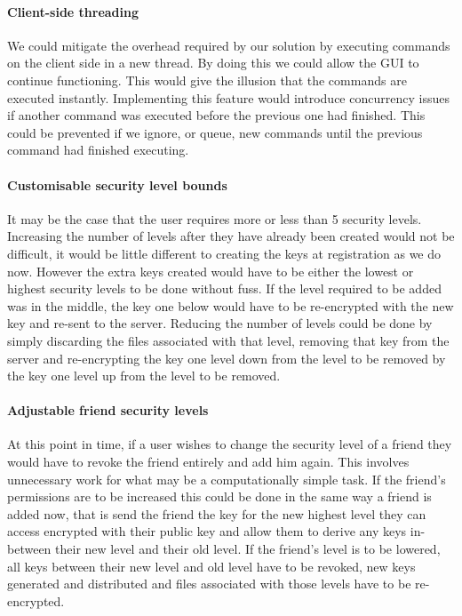 \documentclass[12pt, titlepage]{article}
\begin{document}
\paragraph*{Client-side threading} We could mitigate the overhead required by our solution by executing commands on the client side in a new thread. By doing this we could allow the GUI to continue functioning. This would give the illusion that the commands are executed instantly. Implementing this feature would introduce concurrency issues if another command was executed before the previous one had finished. This could be prevented if we ignore, or queue, new commands until the previous command had finished executing. 
\paragraph*{Customisable security level bounds} It may be the case that the user requires more or less than 5 security levels. Increasing the number of levels after they have already been created would not be difficult, it would be little different to creating the keys at registration as we do now. However the extra keys created would have to be either the lowest or highest security levels to be done without fuss. If the level required to be added was in the middle, the key one below would have to be re-encrypted with the new key and re-sent to the server. Reducing the number of levels could be done by simply discarding the files associated with that level, removing that key from the server and re-encrypting the key one level down from the level to be removed by the key one level up from the level to be removed.
\paragraph*{Adjustable friend security levels} At this point in time, if a user wishes to change the security level of a friend they would have to revoke the friend entirely and add him again. This involves unnecessary work for what may be a computationally simple task. If the friend's permissions are to be increased this could be done in the same way a friend is added now, that is send the friend the key for the new highest level they can access encrypted with their public key and allow them to derive any keys in-between their new level and their old level. If the friend's level is to be lowered, all keys between their new level and old level have to be revoked, new keys generated and distributed and files associated with those levels have to be re-encrypted.
\end{document}
